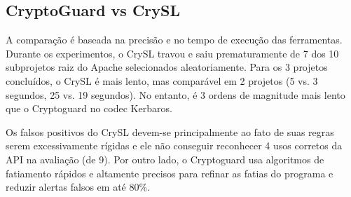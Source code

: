 \subsection{CryptoGuard vs CrySL} %

A comparação é baseada na precisão e no tempo de execução das ferramentas. \cite{CryptoGuard} Durante os experimentos, o CrySL travou e saiu prematuramente de 7 dos 10 subprojetos raiz do Apache selecionados aleatoriamente. \cite{CryptoGuard} Para os 3 projetos concluídos, o CrySL é mais lento, mas comparável em 2 projetos (5 vs. 3 segundos, 25 vs. 19 segundos). \cite{CryptoGuard} No entanto, é 3 ordens de magnitude mais lento que o Cryptoguard no codec Kerbaros. \cite{CryptoGuard}

Os falsos positivos do CrySL devem-se principalmente ao fato de suas regras serem excessivamente rígidas e ele não conseguir reconhecer 4 usos corretos da API na avaliação (de 9). \cite{CryptoGuard} Por outro lado, o Cryptoguard usa algoritmos de fatiamento rápidos e altamente precisos para refinar as fatias do programa e reduzir alertas falsos em até 80\%. \cite{CryptoGuard}

